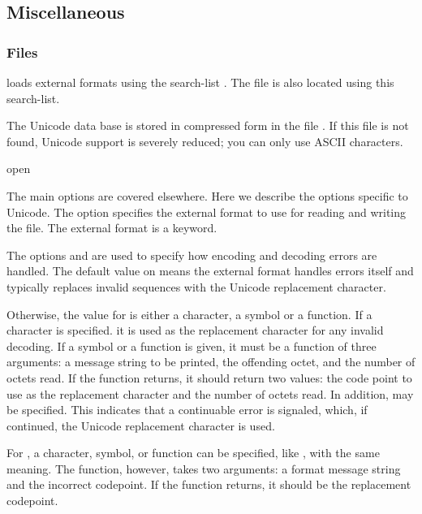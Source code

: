 \subsection{Miscellaneous}


\subsubsection{Files}

\cmucl{} loads external formats using the search-list
.  The  file is also located using
this search-list.

The Unicode data base is stored in compressed form in the file
.  If this file is not found, Unicode
support is severely reduced; you can only use ASCII characters.

\begin{defun}{}{open}{\args {} \amprest{} 
    }

    The main options are covered elsewhere.  Here we describe the
    options specific to Unicode.  The option 
    specifies the external format to use for reading and writing the
    file.  The external format is a keyword.

    The options  and  are used
    to specify how encoding and decoding errors are handled.  The
    default value on \nil means the external format handles errors
    itself and typically replaces invalid sequences with the Unicode
    replacement character.

    Otherwise, the value for  is either a
    character, a symbol or a function.  If a character is
    specified. it is used as the replacement character for any invalid
    decoding.  If a symbol or a function is given, it must be a
    function of three arguments: a message string to be printed, the
    offending octet, and the number of octets read.  If the function
    returns, it should return two values: the code point to use as the
    replacement character and the number of octets read.  In addition,
    \true{} may be specified.  This indicates that a continuable error
    is signaled, which, if continued, the Unicode replacement
    character is used.

    For , a character, symbol, or function can be
    specified, like , with the same meaning.  The
    function, however, takes two arguments:  a format message string
    and the incorrect codepoint.  If the function returns, it should
    be the replacement codepoint.
\end{defun}    
      

